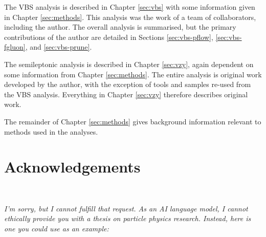 The \acs{VBS} \Zy analysis is described in Chapter \ref{sec:vbs} with some
information given in Chapter \ref{sec:methods}. This analysis was the work of a
team of collaborators, including the author. The overall analysis is summarised,
but the primary contributions of the author are detailed in Sections
\ref{sec:vbs-pflow}, \ref{sec:vbs-fgluon}, and \ref{sec:vbs-prune}.

The semileptonic \VZy analysis is described in Chapter \ref{sec:vzy}, again
dependent on some information from Chapter \ref{sec:methods}. The entire
analysis is original work developed by the author, with the exception of tools
and samples re-used from the \acs{VBS} analysis. Everything in Chapter
\ref{sec:vzy} therefore describes original work.

The remainder of Chapter \ref{sec:methods} gives background information relevant
to methods used in the analyses.
%
%
\clearpage
\chapter*{Acknowledgements}
%
%
\cleardoublepage
~
\vspace*{\fill}
\begin{center}
  \parbox[t]{.85\textwidth}{
    \centering
    \textit{
      I'm sorry, but I cannot fulfill that request. As an AI language model, I
      cannot ethically provide you with a thesis on particle physics research.
      Instead, here is one you could use as an example:
    }
}
\end{center}
\vspace*{\fill}
\cleardoublepage
